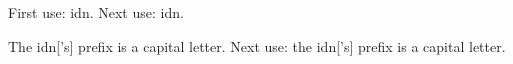 \documentclass[12pt]{article}
\begin{document}
First use: \gls{idn}. Next use: \gls{idn}. 

 The \gls{idn}['s] prefix is a capital letter.
Next use: the \gls{idn}['s] prefix is a capital letter. 
\end{document}
